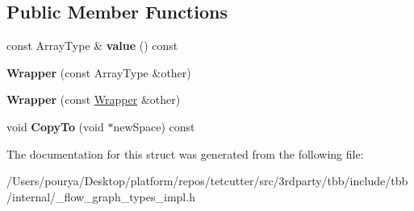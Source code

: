 \subsection*{Public Member Functions}
\begin{DoxyCompactItemize}
\item 
\hypertarget{structinternal_1_1Wrapper_3_01T[N]_4_a816572d19d70208b03a85edea84961f6}{}const Array\+Type \& {\bfseries value} () const \label{structinternal_1_1Wrapper_3_01T[N]_4_a816572d19d70208b03a85edea84961f6}

\item 
\hypertarget{structinternal_1_1Wrapper_3_01T[N]_4_a3079cd5a899d01fc9bee0e37306c3d7b}{}{\bfseries Wrapper} (const Array\+Type \&other)\label{structinternal_1_1Wrapper_3_01T[N]_4_a3079cd5a899d01fc9bee0e37306c3d7b}

\item 
\hypertarget{structinternal_1_1Wrapper_3_01T[N]_4_a0e6372a612beec4c87cc972ac769c475}{}{\bfseries Wrapper} (const \hyperlink{structinternal_1_1Wrapper}{Wrapper} \&other)\label{structinternal_1_1Wrapper_3_01T[N]_4_a0e6372a612beec4c87cc972ac769c475}

\item 
\hypertarget{structinternal_1_1Wrapper_3_01T[N]_4_a8b31586d3422f64ec3eac8711e8d8e50}{}void {\bfseries Copy\+To} (void $\ast$new\+Space) const \label{structinternal_1_1Wrapper_3_01T[N]_4_a8b31586d3422f64ec3eac8711e8d8e50}

\end{DoxyCompactItemize}


The documentation for this struct was generated from the following file\+:\begin{DoxyCompactItemize}
\item 
/\+Users/pourya/\+Desktop/platform/repos/tetcutter/src/3rdparty/tbb/include/tbb/internal/\+\_\+flow\+\_\+graph\+\_\+types\+\_\+impl.\+h\end{DoxyCompactItemize}
